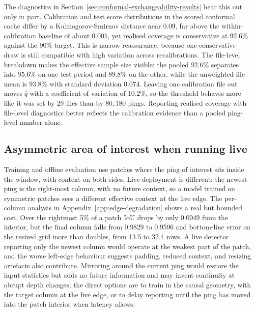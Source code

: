 The diagnostics in Section~\ref{sec:conformal-exchangeability-results} bear this out only in part. Calibration and test score distributions in the scored conformal cache differ by a Kolmogorov-Smirnov distance near $0.09$, far above the within-calibration baseline of about $0.005$, yet realised coverage is conservative at $92.6\%$ against the $90\%$ target. This is narrow reassurance, because one conservative draw is still compatible with high variation across recalibrations. The file-level breakdown makes the effective sample size visible: the pooled $92.6\%$ separates into $95.6\%$ on one test period and $89.8\%$ on the other, while the unweighted file mean is $93.8\%$ with standard deviation $0.074$. Leaving one calibration file out moves $\hat q$ with a coefficient of variation of $10.2\%$, so the threshold behaves more like it was set by 29 files than by $80{,}180$ pings. Reporting realised coverage with file-level diagnostics better reflects the calibration evidence than a pooled ping-level number alone.

\subsection{Asymmetric area of interest when running live}
Training and offline evaluation use patches where the ping of interest sits inside the window, with context on both sides. Live deployment is different: the newest ping is the right-most column, with no future context, so a model trained on symmetric patches sees a different effective context at the live edge. The per-column analysis in Appendix~\ref{app:edge-degradation} shows a real but bounded cost. Over the rightmost 5\% of a patch IoU drops by only 0.0049 from the interior, but the final column falls from 0.9829 to 0.9596 and bottom-line error on the resized grid more than doubles, from 13.5 to 32.4 rows. A live detector reporting only the newest column would operate at the weakest part of the patch, and the worse left-edge behaviour suggests padding, reduced context, and resizing artefacts also contribute. Mirroring around the current ping would restore the input statistics but adds no future information and may invent continuity at abrupt depth changes; the direct options are to train in the causal geometry, with the target column at the live edge, or to delay reporting until the ping has moved into the patch interior when latency allows.


